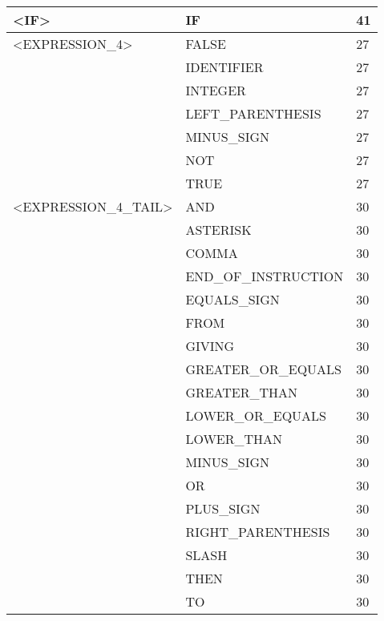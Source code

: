 \begin{longtable}{|l|l|l|}
<IF>                 &   IF                   &   41 \\ \hline
<EXPRESSION\_4>       &   FALSE                &   27 \\ \hline
                     &   IDENTIFIER           &   27 \\ \hline
                     &   INTEGER              &   27 \\ \hline
                     &   LEFT\_PARENTHESIS     &   27 \\ \hline
                     &   MINUS\_SIGN           &   27 \\ \hline
                     &   NOT                  &   27 \\ \hline
                     &   TRUE                 &   27 \\ \hline
<EXPRESSION\_4\_TAIL>  &   AND                  &   30 \\ \hline
                     &   ASTERISK             &   30 \\ \hline
                     &   COMMA                &   30 \\ \hline
                     &   END\_OF\_INSTRUCTION   &   30 \\ \hline
                     &   EQUALS\_SIGN          &   30 \\ \hline
                     &   FROM                 &   30 \\ \hline
                     &   GIVING               &   30 \\ \hline
                     &   GREATER\_OR\_EQUALS    &   30 \\ \hline
                     &   GREATER\_THAN         &   30 \\ \hline
                     &   LOWER\_OR\_EQUALS      &   30 \\ \hline
                     &   LOWER\_THAN           &   30 \\ \hline
                     &   MINUS\_SIGN           &   30 \\ \hline
                     &   OR                   &   30 \\ \hline
                     &   PLUS\_SIGN            &   30 \\ \hline
                     &   RIGHT\_PARENTHESIS    &   30 \\ \hline
                     &   SLASH                &   30 \\ \hline
                     &   THEN                 &   30 \\ \hline
                     &   TO                   &   30 \\ \hline

\end{longtable}
